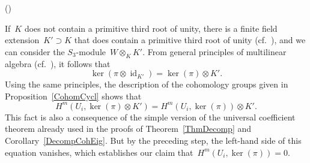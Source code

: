 \documentclass[12pt]{article}
\makeatletter
\newcounter{num}
\newenvironment{pflist}{\begin{list}{(\arabic{num})}{\usecounter{num} \leftmargin0cm \itemindent5pt}}{\end{list}}
\theoremstyle{definition}
\theoremstyle{break}
\renewenvironment{proof}[1][\proofname]{\par
\vspace{-5pt}%
\pushQED{\qed}%
\normalfont
\topsep0pt \partopsep0pt %
\trivlist
\item[\hskip\labelsep
\bfseries
#1\@addpunct{.}]\ignorespaces
}{%
\popQED\endtrivlist\@endpefalse
\addvspace{6pt plus 6pt} %
}
\DeclareMathOperator\id{id}
\renewcommand{\1}{\mathbbm{1}}
\newcommand{\ot}{\mathbin{\otimes}}
\makeatother
\begin{document}
\begin{proof}
\begin{pflist}
\item
If~$K$ does not contain a primitive third root of unity, there is a finite field extension~$K' \supset K$ that does contain a primitive third root of unity
(cf.~\cite[Chap.~I, \S~5, Thm.~6, p.~32]{J}), and we can consider the $S_3$-module~$W \ot_K K'$.
From general principles of multilinear algebra (cf.~\cite[Sec.~1.19, p.~24]{Gr2}), it follows that
\[\ker(\pi \ot \id_{K'}) = \ker(\pi) \ot K'.\]
Using the same principles, the description of the cohomology groups given in Proposition~\ref{CohomCycl} shows that
\[H^m(U_i,\ker(\pi) \ot K') = H^m(U_i,\ker(\pi)) \ot K'.\]
This fact is also a consequence of the simple version of the universal coefficient theorem already used in the proofs of Theorem~\ref{ThmDecomp} and Corollary~\ref{DecompCohEig}. But by the preceding step, the left-hand side of this equation vanishes, which establishes our claim that~$H^m(U_i,\ker(\pi)) = 0$.
\qedhere
\end{pflist}
\end{proof}
\end{document}
